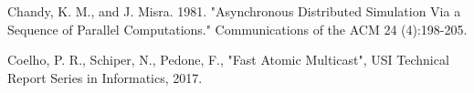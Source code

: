\documentclass[a4paper, 12pt]{article}
\begin{document}
\begin{thebibliography}{99}

    Chandy, K. M., and J. Misra. 1981. "Asynchronous Distributed Simulation Via a Sequence of Parallel Computations." Communications of the ACM 24 (4):198-205.

    Coelho, P. R., Schiper, N., Pedone, F., "Fast Atomic Multicast", USI Technical Report Series in Informatics, 2017.

\end{thebibliography}
\end{document}
